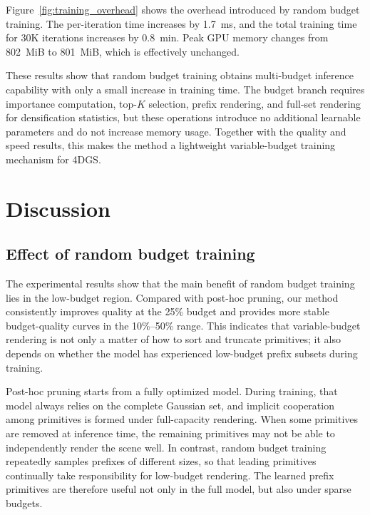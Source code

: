 \documentclass[pdflatex,sn-mathphys]{sn-jnl}
\begin{document}
Figure~\ref{fig:training_overhead} shows the overhead introduced by random budget training. The per-iteration time increases by 1.7~ms, and the total training time for 30K iterations increases by 0.8~min. Peak GPU memory changes from 802~MiB to 801~MiB, which is effectively unchanged.

These results show that random budget training obtains multi-budget inference capability with only a small increase in training time. The budget branch requires importance computation, top-$K$ selection, prefix rendering, and full-set rendering for densification statistics, but these operations introduce no additional learnable parameters and do not increase memory usage. Together with the quality and speed results, this makes the method a lightweight variable-budget training mechanism for 4DGS.

\section{Discussion}
\label{sec:discussion}

\subsection{Effect of random budget training}

The experimental results show that the main benefit of random budget training lies in the low-budget region. Compared with post-hoc pruning, our method consistently improves quality at the 25\% budget and provides more stable budget-quality curves in the 10\%--50\% range. This indicates that variable-budget rendering is not only a matter of how to sort and truncate primitives; it also depends on whether the model has experienced low-budget prefix subsets during training.

Post-hoc pruning starts from a fully optimized model. During training, that model always relies on the complete Gaussian set, and implicit cooperation among primitives is formed under full-capacity rendering. When some primitives are removed at inference time, the remaining primitives may not be able to independently render the scene well. In contrast, random budget training repeatedly samples prefixes of different sizes, so that leading primitives continually take responsibility for low-budget rendering. The learned prefix primitives are therefore useful not only in the full model, but also under sparse budgets.
\end{document}
